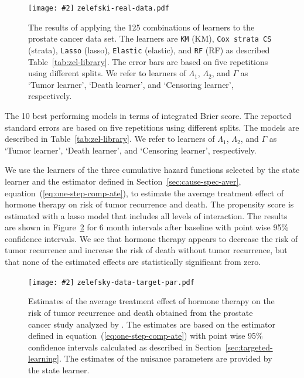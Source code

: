 \documentclass{statsoc}
\newcommand{\includeFigCond}[2][]{
  \ifx\nofig\undefined %
    \texttt{[image: \#2]} %
  \else %
    \texttt{#2} %
  \fi %
}
\newcommand{\1}{\mathds{1}}
\begin{document}
\begin{figure}
  \centering %
  \includeFigCond[width=1\linewidth]{zelefski-real-data.pdf}
  \caption[]{The results of applying the 125 combinations of learners to the
    prostate cancer data set. The learners are \texttt{KM} (KM), \texttt{Cox
      strata CS} (strata), \texttt{Lasso} (lasso), \texttt{Elastic} (elastic),
    and \texttt{RF} (RF) as described Table~\ref{tab:zel-library}. The error
    bars are based on five repetitions using different splits. We refer to
    learners of \( \Lambda_1 \), \( \Lambda_2 \), and $\Gamma$ as `Tumor
    learner', `Death learner', and `Censoring learner', respectively.}
  \label{fig:zelefski-real}
\end{figure}


\begin{table}
  \caption{\label{tab:zelefski-real}The 10 best performing models in terms of integrated Brier score. The
    reported standard errors are based on five repetitions using different
    splits. The models are described in Table~\ref{tab:zel-library}. We refer to
    learners of \( \Lambda_1 \), \( \Lambda_2 \), and $\Gamma$ as `Tumor
    learner', `Death learner', and `Censoring learner', respectively.}
  \centering
  
\end{table}



We use the learners of the three cumulative hazard functions
selected by the state learner and the estimator defined in
Section~\ref{sec:cause-spec-aver}, equation~(\ref{eq:one-step-comp-ate}), to
estimate the average treatment effect of hormone therapy on risk of tumor
recurrence and death. The propensity score is estimated with a lasso model that
includes all levels of interaction. The results are shown in
Figure~\ref{fig:zelefski-real-target} for 6 month intervals after baseline with
point wise 95\% confidence intervals. We see that hormone therapy appears to
decrease the risk of tumor recurrence and increase the risk of death without
tumor recurrence, but that none of the estimated effects are statistically
significant from zero.

\begin{figure}
  \centering%
  \includeFigCond[width=1\linewidth]{zelefsky-data-target-par.pdf}
  \caption[]{Estimates of the average treatment effect of hormone therapy on the
    risk of tumor recurrence and death obtained from the prostate cancer study
    analyzed by \cite{kattan2000pretreatment}. The estimates are based on the
    estimator defined in equation~(\ref{eq:one-step-comp-ate}) with point wise
    95\% confidence intervals calculated as described in
    Section~\ref{sec:targeted-learning}. The estimates of the nuisance
    parameters are provided by the state learner.}
  \label{fig:zelefski-real-target}
\end{figure}
\end{document}
